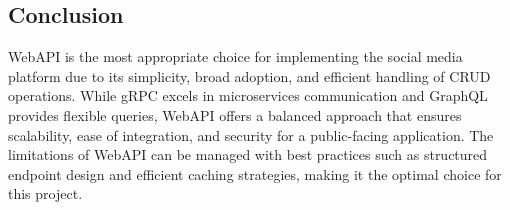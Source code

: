 \documentclass[a4paper, 11pt]{article}
\begin{document}
    \subsection{Conclusion}
    WebAPI is the most appropriate choice for implementing the social media platform due to its simplicity, broad adoption, and efficient handling of CRUD operations. While gRPC excels in microservices communication and GraphQL provides flexible queries, WebAPI offers a balanced approach that ensures scalability, ease of integration, and security for a public-facing application. The limitations of WebAPI can be managed with best practices such as structured endpoint design and efficient caching strategies, making it the optimal choice for this project.



\end{document}
